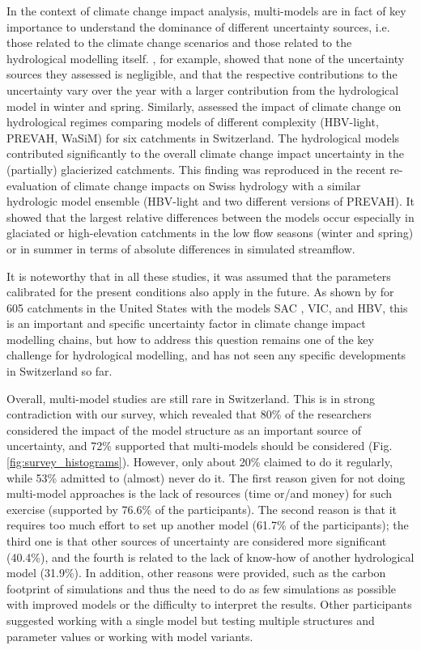 \documentclass[10pt,a4paper]{article}
\begin{document}
In the context of climate change impact analysis, multi-models are in fact of key importance to understand the dominance of different uncertainty sources, i.e. those related to the climate change scenarios and those related to the hydrological modelling itself. \citet{Bosshard2013a}, for example, showed that none of the uncertainty sources they assessed is negligible, and that the respective contributions to the uncertainty vary over the year with a larger contribution from the hydrological model in winter and spring. Similarly, \citet{Addor2014} assessed the impact of climate change on hydrological regimes comparing models of different complexity (HBV-light, PREVAH, WaSiM) for six catchments in Switzerland. The hydrological models contributed significantly to the overall climate change impact uncertainty in the (partially) glacierized catchments. This finding was reproduced in the recent re-evaluation of climate change impacts on Swiss hydrology \citep[Hydro-CH2018,][]{FOEN2021} with a similar hydrologic model ensemble (HBV-light and two different versions of PREVAH). It showed that the largest relative differences between the models occur especially in glaciated or high-elevation catchments in the low flow seasons (winter and spring) or in summer in terms of absolute differences in simulated streamflow.

It is noteworthy that in all these studies, it was assumed that the parameters calibrated for the present conditions also apply in the future. As shown by \citet{Melsen2021} for 605 catchments in the United States with the models SAC \citep[Sacramento Soil Moisture Accounting model;][]{Burnash1973}, VIC, and HBV, this is an important and specific uncertainty factor in climate change impact modelling chains, but how to address this question remains one of the key challenge for hydrological modelling, and has not seen any specific developments in Switzerland so far. 

Overall, multi-model studies are still rare in Switzerland. This is in strong contradiction with our survey, which revealed that 80\% of the researchers considered the impact of the model structure as an important source of uncertainty, and 72\% supported that multi-models should be considered (Fig. \ref{fig:survey_histograms}). However, only about 20\% claimed to do it regularly, while 53\% admitted to (almost) never do it. The first reason given for not doing multi-model approaches is the lack of resources (time or/and money) for such exercise (supported by 76.6\% of the participants). The second reason is that it requires too much effort to set up another model (61.7\% of the participants); the third one is that other sources of uncertainty are considered more significant (40.4\%), and the fourth is related to the lack of know-how of another hydrological model (31.9\%). In addition, other reasons were provided, such as the carbon footprint of simulations and thus the need to do as few simulations as possible with improved models or the difficulty to interpret the results. Other participants suggested working with a single model but testing multiple structures and parameter values or working with model variants.
\end{document}
